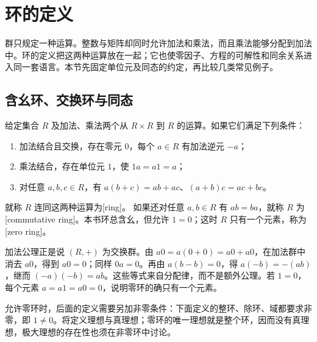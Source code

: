
\section{环的定义}
\label{b1:sec:1001}

群只规定一种运算。整数与矩阵却同时允许加法和乘法，而且乘法能够分配到加法中。环的定义把这两种运算放在一起；它也使零因子、方程的可解性和同余关系进入同一套语言。本节先固定单位元及同态的约定，再比较几类常见例子。

%
%

\subsection{含幺环、交换环与同态}
\label{b1:subsec:1001:01}
\begin{definition}\label{b1:def:ring}
	给定集合 \(R\) 及加法、乘法两个从 \(R\times R\) 到 \(R\) 的运算。如果它们满足下列条件：
	\begin{enumerate}
		\item 加法结合且交换，存在零元 \(0\)，每个 \(a\in R\) 有加法逆元 \(-a\)；
		\item 乘法结合，存在单位元 \(1\)，使 \(1a=a1=a\)；
		\item 对任意 \(a,b,c\in R\)，有 \(a(b+c)=ab+ac\)、\((a+b)c=ac+bc\)。
	\end{enumerate}
	就称 \(R\) 连同这两种运算为[ring]。
	如果还对任意 \(a,b\in R\) 有 \(ab=ba\)，就称 \(R\) 为[commutative ring]。本书环总含幺，但允许 \(1=0\)；这时 \(R\) 只有一个元素，称为[zero ring]。
\end{definition}
加法公理正是说 \((R,+)\) 为交换群。由 \(a0=a(0+0)=a0+a0\)，在加法群中消去 \(a0\)，得到 \(a0=0\)；同样 \(0a=0\)。再由 \(a(b-b)=0\)，得 \(a(-b)=-(ab)\)，继而 \((-a)(-b)=ab\)。这些等式来自分配律，而不是额外公理。若 \(1=0\)，每个元素 \(a=a1=a0=0\)，说明零环的确只有一个元素。

\ProseParagraphBreak
允许零环时，后面的定义需要另加非零条件：下面定义的整环、除环、域都要求非零，即 \(1\ne0\)。将定义理想与真理想；零环的唯一理想就是整个环，因而没有真理想，极大理想的存在性也须在非零环中讨论。

